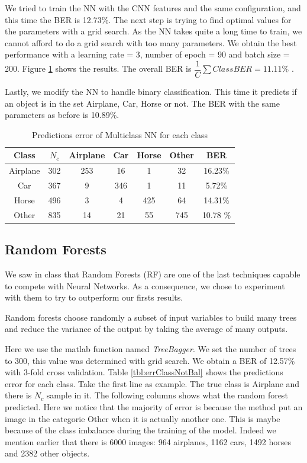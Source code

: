 \documentclass{article} %
\begin{document}
We tried to train the NN with the CNN features and the same configuration, and this time the BER is 12.73\%.
The next step is trying to find optimal values for the parameters with a grid search. As the NN takes quite a long time to train, we cannot afford to do a grid search with too many parameters.
We obtain the best performance with a learning rate = 3, number of epoch = 90 and batch size = 200. 
Figure \ref{tbl:errClassNN} shows the results. The overall BER is $\dfrac{1}{C}\sum Class BER= 11.11\%$ . 

Lastly, we modify the NN to handle binary classification. This time it predicts if an object is in the set {Airplane, Car, Horse} or not. The BER with the same parameters as before is 10.89\%.

\begin{table}
	\centering
	\begin{tabular}{|c|c|c|c|c|c|c|}
		\hline Class & $N_{c}$ & Airplane & Car & Horse & Other & BER \\ 
		\hline Airplane & 302 & 253 & 16 & 1 & 32 & 16.23\% \\ 
		\hline Car & 367 & 9 & 346 & 1 & 11 & 5.72\% \\ 
		\hline Horse & 496 & 3 & 4 & 425 & 64 & 14.31\% \\ 
		\hline Other & 835 & 14 & 21 & 55 & 745 & 10.78 \% \\ 
		\hline 
	\end{tabular} 
	\caption{Predictions error of Multiclass NN for each class}
	\label{tbl:errClassNN}
\end{table}

\subsection{Random Forests}
We saw in class that Random Forests (RF) are one of the last techniques capable to compete with Neural Networks.
As a consequence, we chose to experiment with them to try to outperform our firsts results.

Random forests choose randomly a subset of input variables to build many trees and reduce the variance of the output by taking the average of many outputs.

Here we use the matlab function named \emph{TreeBagger}. We set the number of trees to 300, this value was determined with grid search.
We obtain a BER of 12.57\% with 3-fold cross validation. Table \ref{tbl:errClassNotBal} shows the predictions error for each class. Take the first line as example. The true class is Airplane and there is $N_c$ sample in it. The following columns shows what the random forest predicted.
Here we notice that the majority of error is because the method put an image in the categorie Other when it is actually another one.
This is maybe because of the class imbalance during the training of the model. Indeed we mention earlier that there is 6000 images: 964 airplanes, 1162 cars, 1492 horses and 2382 other objects.
\end{document}
